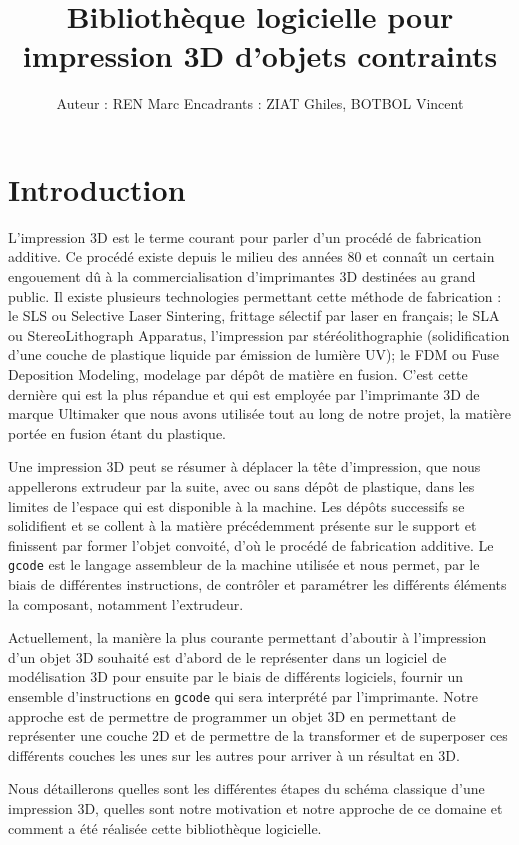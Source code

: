\documentclass[11pt, titlepage]{article}
\author{Auteur : REN Marc
Encadrants : ZIAT Ghiles, BOTBOL Vincent}
\title{Bibliothèque logicielle pour impression 3D d’objets contraints}
\begin{document}
\maketitle
\newpage
\newpage
\tableofcontents
\newpage
\section{Introduction}
L'impression 3D est le terme courant pour parler d'un procédé de fabrication additive. Ce procédé existe depuis le milieu des années 80 et connaît un certain engouement dû à la commercialisation d'imprimantes 3D destinées au grand public.
Il existe plusieurs technologies permettant cette méthode de fabrication :
le SLS ou Selective Laser Sintering, frittage sélectif par laser en français;
le SLA ou StereoLithograph Apparatus, l'impression par stéréolithographie (solidification d'une couche de plastique liquide par émission de lumière UV);
le FDM ou Fuse Deposition Modeling, modelage par dépôt de matière en fusion.
C'est cette dernière qui est la plus répandue et qui est employée par l'imprimante 3D de marque Ultimaker que nous avons utilisée tout au long de notre projet, la matière portée en fusion étant du plastique.

Une impression 3D peut se résumer à déplacer la tête d'impression, que nous appellerons extrudeur par la suite, avec ou sans dépôt de plastique, dans les limites de l'espace qui est disponible à la machine. Les dépôts successifs se solidifient et se collent à la matière précédemment présente sur le support et finissent par former l'objet convoité, d'où le procédé de fabrication additive. Le \verb&gcode& est le langage assembleur de la machine utilisée et nous permet, par le biais de différentes instructions, de contrôler et paramétrer les différents éléments la composant, notamment l'extrudeur.

Actuellement, la manière la plus courante permettant d'aboutir à l'impression d'un objet 3D souhaité est d'abord de le représenter dans un logiciel de modélisation 3D pour ensuite par le biais de différents logiciels, fournir un ensemble d'instructions en \verb&gcode& qui sera interprété par l'imprimante. Notre approche est de permettre de programmer un objet 3D en permettant de représenter une couche 2D et de permettre de la transformer et de superposer ces différents couches les unes sur les autres pour arriver à un résultat en 3D.

Nous détaillerons quelles sont les différentes étapes du schéma classique d'une impression 3D, quelles sont notre motivation et notre approche de ce domaine et comment a été réalisée cette bibliothèque logicielle.
\end{document}
